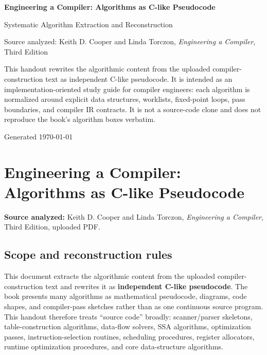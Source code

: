 \documentclass[10pt,letterpaper]{article}
\newcommand{\handouttitle}{Engineering a Compiler: Algorithms as C-like Pseudocode}
\begin{document}
\begin{titlepage}
\centering
\vspace*{1.0in}
{\Huge\bfseries\color{HouseBlue}\handouttitle\par}
\vspace{0.25in}
{\Large Systematic Algorithm Extraction and Reconstruction\par}
\vspace{0.35in}
{\large Source analyzed: Keith D. Cooper and Linda Torczon, \emph{Engineering a Compiler}, Third Edition\par}
\vfill
\begin{minipage}{0.86\textwidth}
\small
This handout rewrites the algorithmic content from the uploaded compiler-construction text as independent C-like pseudocode. It is intended as an implementation-oriented study guide for compiler engineers: each algorithm is normalized around explicit data structures, worklists, fixed-point loops, pass boundaries, and compiler IR contracts. It is not a source-code clone and does not reproduce the book's algorithm boxes verbatim.
\end{minipage}
\vfill
{\large Generated \today\par}
\end{titlepage}
\clearpage
{}
\tableofcontents
\clearpage
{}

\clearpage
\section*{Engineering a Compiler: Algorithms as C-like Pseudocode}

\textbf{Source analyzed:} Keith D. Cooper and Linda Torczon, \emph{Engineering a Compiler}, Third Edition, uploaded PDF.

\subsection*{Scope and reconstruction rules}

This document extracts the algorithmic content from the uploaded compiler-construction text and rewrites it as \textbf{independent C-like pseudocode}. The book presents many algorithms as mathematical pseudocode, diagrams, code shapes, and compiler-pass sketches rather than as one continuous source program. This handout therefore treats ``source code'' broadly: scanner/parser skeletons, table-construction algorithms, data-flow solvers, SSA algorithms, optimization passes, instruction-selection routines, scheduling procedures, register allocators, runtime optimization procedures, and core data-structure algorithms.
\end{document}
